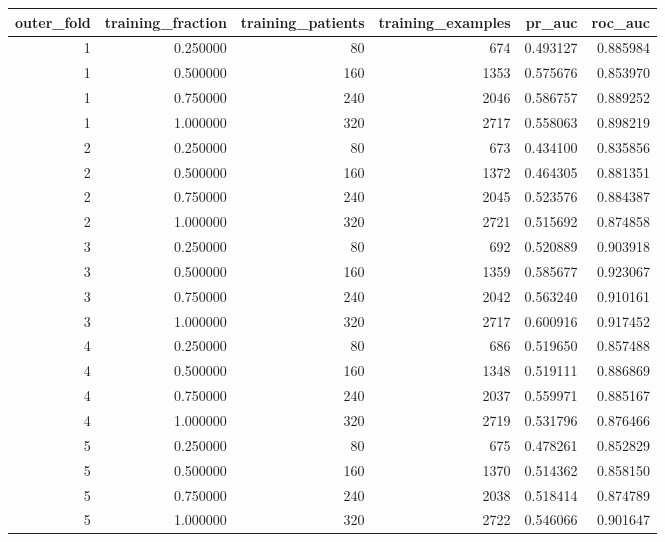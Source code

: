 \begin{tabular}{rrrrrr}
\toprule
outer\_fold & training\_fraction & training\_patients & training\_examples & pr\_auc & roc\_auc \\
\midrule
1 & 0.250000 & 80 & 674 & 0.493127 & 0.885984 \\
1 & 0.500000 & 160 & 1353 & 0.575676 & 0.853970 \\
1 & 0.750000 & 240 & 2046 & 0.586757 & 0.889252 \\
1 & 1.000000 & 320 & 2717 & 0.558063 & 0.898219 \\
2 & 0.250000 & 80 & 673 & 0.434100 & 0.835856 \\
2 & 0.500000 & 160 & 1372 & 0.464305 & 0.881351 \\
2 & 0.750000 & 240 & 2045 & 0.523576 & 0.884387 \\
2 & 1.000000 & 320 & 2721 & 0.515692 & 0.874858 \\
3 & 0.250000 & 80 & 692 & 0.520889 & 0.903918 \\
3 & 0.500000 & 160 & 1359 & 0.585677 & 0.923067 \\
3 & 0.750000 & 240 & 2042 & 0.563240 & 0.910161 \\
3 & 1.000000 & 320 & 2717 & 0.600916 & 0.917452 \\
4 & 0.250000 & 80 & 686 & 0.519650 & 0.857488 \\
4 & 0.500000 & 160 & 1348 & 0.519111 & 0.886869 \\
4 & 0.750000 & 240 & 2037 & 0.559971 & 0.885167 \\
4 & 1.000000 & 320 & 2719 & 0.531796 & 0.876466 \\
5 & 0.250000 & 80 & 675 & 0.478261 & 0.852829 \\
5 & 0.500000 & 160 & 1370 & 0.514362 & 0.858150 \\
5 & 0.750000 & 240 & 2038 & 0.518414 & 0.874789 \\
5 & 1.000000 & 320 & 2722 & 0.546066 & 0.901647 \\
\bottomrule
\end{tabular}
